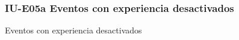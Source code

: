 
\subsubsection{IU-E05a Eventos con experiencia desactivados}


    {Eventos con experiencia desactivados}

\begin{comment}
\subsubsection{Elementos Relevantes}

    \begin{itemize}
    \item {\bf Lorem ipsum}
        ...
    \end{itemize}

\subsubsection{Acciones relevantes}

    \begin{itemize}
    \item {\bf Lorem ipsum}
        ...
    \end{itemize}
\end{comment}

\clearpage

